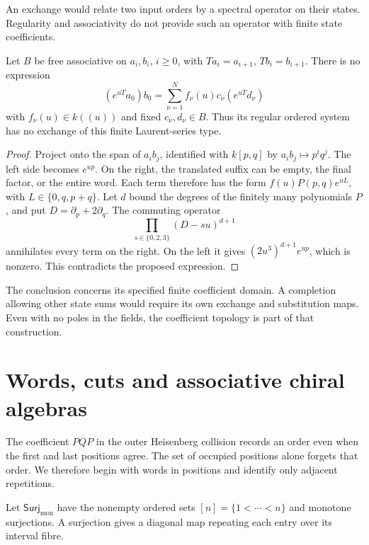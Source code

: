 An exchange would relate two input orders by a spectral
operator on their states. Regularity and associativity do not
provide such an operator with finite state coefficients.

\begin{proposition}\label{e1f:prop:noexchange}
Let \(B\) be free associative on \(a_i,b_i\), \(i\geq0\),
with \(Ta_i=a_{i+1}\), \(Tb_i=b_{i+1}\). There is no
expression
\[
 (e^{uT}a_0)b_0
       =\sum_{\nu=1}^N f_\nu(u)c_\nu(e^{uT}d_\nu)
\]
with \(f_\nu(u)\in k((u))\) and fixed \(c_\nu,d_\nu\in B\).
Thus its regular ordered system has no exchange of this finite
Laurent-series type.
\end{proposition}

\begin{proof}
Project onto the span of \(a_ib_j\), identified with
\(k[p,q]\) by \(a_ib_j\mapsto p^iq^j\). The left side
becomes \(e^{up}\). On the right, the translated suffix can
be empty, the final factor, or the entire word. Each term
therefore has the form
\(f(u)P(p,q)e^{uL}\), with
\(L\in\{0,q,p+q\}\). Let \(d\) bound the degrees of
the finitely many polynomials \(P\), and put
\(D=\partial_p+2\partial_q\).
The commuting operator
\[
 \prod_{s\in\{0,2,3\}}(D-su)^{d+1}
\]
annihilates every term on the right. On the left it gives
\((2u^3)^{d+1}e^{up}\), which is nonzero. This contradicts
the proposed expression.
\end{proof}

The conclusion concerns its specified finite coefficient
domain. A completion allowing other state sums would require
its own exchange and substitution maps. Even with no poles
in the fields, the coefficient topology is part of that
construction.

\section{Words, cuts and associative chiral algebras}
\label{e1f:sec:tensor}

The coefficient \(PQP\) in the outer Heisenberg collision
records an order even when the first and last positions agree.
The set of occupied positions alone forgets that order.
We therefore begin with words in positions and identify only
adjacent repetitions.

Let \(\mathsf{Surj}_{\mathrm{mon}}\) have the nonempty ordered
sets \([n]=\{1<\cdots<n\}\) and monotone surjections.
A surjection gives a diagonal map repeating each entry over
its interval fibre.

